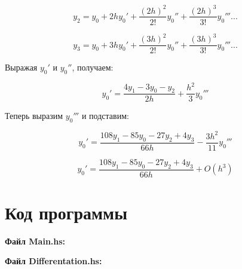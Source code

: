 \documentclass[a4paper,12pt]{article}
\begin{document}
$$ y_{2} = y_{0} + 2hy_{0}' + \frac{(2h)^2}{2!}y_{0}''+\frac{(2h)^3}{3!}y_{0}'''...$$

$$ y_{3} = y_{0} + 3hy_{0}' + \frac{(3h)^2}{2!}y_{0}''+\frac{(3h)^3}{3!}y_{0}'''...$$

\noindent Выражая $y_{0}'$ и $y_{0}''$, получаем: 

$$ y_{0}' = \frac{4y_{1} -3y_{0} - y_{2}}{2h} + \frac{h^2}{3}y_{0}'''$$

\clearpage

\noindent Теперь выразим $y_{0}'''$ и подставим:

$$ y_{0}' = \frac{108y_{1} - 85y_{0} - 27y_{2} + 4y_{3}}{66h} - \frac{3h^2}{11}y_{0}''' $$

$$ y_{0}' = \frac{108y_{1} - 85y_{0} - 27y_{2} + 4y_{3}}{66h} + O(h^3) $$


\section{Код программы}
\noindent\textbf{Файл Main.hs:}


\noindent\textbf{\newline Файл Differentation.hs:}

\end{document}
